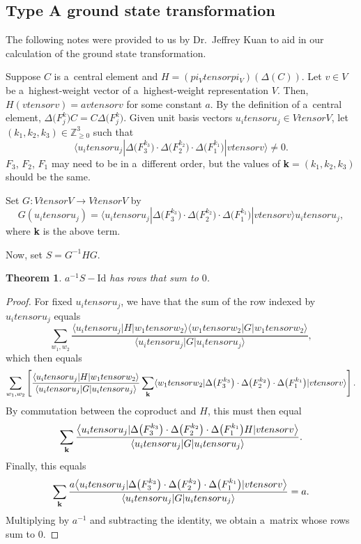 \documentclass[10pt,a4paper]{amsart}
\numberwithin{equation}{section}
\newtheorem{Theorem}{Theorem}[section]
\theoremstyle{definition}
\def\pi{pi}
\def\otimes{ tensor }
\begin{document}
\subsection[Type A ground state transformation]{Type A ground state transformation} \label{subsection-groundstatetransformation}
The following notes were provided to us by Dr.~Jeffrey Kuan to aid in our calculation of the ground state transformation.

Suppose $C$ is a~central element and $H= (\pi_V \otimes \pi_V) (\Delta (C))$. Let $v \in V$ be a~highest-weight vector of a~highest-weight representation $V$. Then,
$H(v \otimes v) = av\otimes v$
for some constant $a$. By the definition of a~central element,
$\Delta\bigl(F_j^k\bigr) C = C \Delta\bigl(F_j^k\bigr)$.
Given unit basis vectors $u_i \otimes u_j \in V \otimes V$, let $(k_1, k_2, k_3) \in \mathbb{Z}_{\geq 0}^3$ such that
\[
\bigl\langle u_i \otimes u_j|\Delta\bigl(F_3^{k_3}\bigr) \cdot \Delta\bigl(F_2^{k_2}\bigr) \cdot \Delta\bigl(F_1^{k_1}\bigr) | v \otimes v \bigr\rangle \neq 0.
\]
$F_3$, $F_2$, $F_1$ may need to be in a~different order, but the values of \textbf{k}$= (k_1, k_2, k_3)$ should be the same.

Set $G\colon V \otimes V \to V \otimes V$ by
\[G(u_i \otimes u_j) =\bigl\langle u_i \otimes u_j | \Delta\bigl(F_3^{k_3}\bigr) \cdot \Delta\bigl(F_2^{k_2}\bigr) \cdot \Delta\bigl(F_1^{k_1}\bigr) | v \otimes v \bigr\rangle u_i \otimes u_j,
 \]
where \textbf{k} is the above term.

Now, set $S = G^{-1}HG$.
\begin{Theorem}
 $a^{-1}S-\mathrm{Id}$ has rows that sum to $0$.
\end{Theorem}
\begin{proof}
 For fixed $u_i \otimes u_j$, we have that the sum of the row indexed by $u_i \otimes u_j$ equals
 \[
 \sum_{w_1,w_2} \frac{\langle u_i \otimes u_j | H | w_1 \otimes w_2 \rangle \langle w_1 \otimes w_2 | G | w_1 \otimes w_2 \rangle}{\langle u_i \otimes u_j | G | u_i \otimes u_j \rangle},
 \]
 which then equals
 \[
 \sum_{w_1,w_2} \left[ \frac{\langle u_i \otimes u_j | H | w_1 \otimes w_2 \rangle }{\langle u_i \otimes u_j | G | u_i \otimes u_j \rangle} \sum_{\text{\textbf{k}}} \langle w_1 \otimes w_2 | \Delta\bigl(F_3^{k_3}\bigr) \cdot \Delta\bigl(F_2^{k_2}\bigr) \cdot \Delta\bigl(F_1^{k_1}\bigr) | v \otimes v \rangle \right].\]
 By commutation between the coproduct and $H$, this must then equal
 \[
 \sum_{\text{\textbf{k}}} \frac{\bigl\langle u_i \otimes u_j | \Delta\bigl(F_3^{k_3}\bigr) \cdot \Delta\bigl(F_2^{k_2}\bigr) \cdot \Delta\bigl(F_1^{k_1}\bigr)H | v \otimes v \bigr\rangle}{\langle u_i \otimes u_j | G | u_i \otimes u_j \rangle}.
 \]
 Finally, this equals
 \[
 \sum_{\text{\textbf{k}}} \frac{a\bigl\langle u_i \otimes u_j | \Delta\bigl(F_3^{k_3}\bigr) \cdot \Delta\bigl(F_2^{k_2}\bigr) \cdot \Delta\bigl(F_1^{k_1}\bigr) | v \otimes v \bigr\rangle}{\langle u_i \otimes u_j | G | u_i \otimes u_j \rangle} = a.
 \]
 Multiplying by $a^{-1}$ and subtracting the identity, we obtain a~matrix whose rows sum to $0$.
\end{proof}
\end{document}
